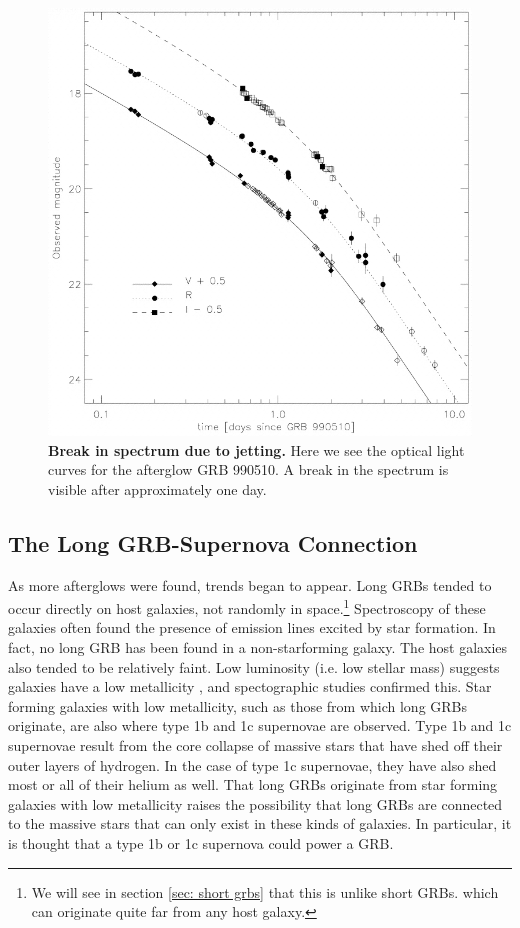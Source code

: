 \documentclass[11pt]{cuthesis}
\begin{document}
\begin{figure} %
\begin{center}
\includegraphics[width=0.8\linewidth]{jetbreak.png}
\end{center}
\caption{\textbf{Break in spectrum due to jetting.} Here we see the optical light curves for the afterglow GRB 990510. A break in the spectrum is visible after approximately one day.\cite{Harrison_1999} }
\label{fig:jetbreak}
\end{figure}

\subsection{The Long GRB-Supernova Connection}
As more afterglows were found, trends began to appear. Long GRBs tended to occur directly on host galaxies, not randomly in space.\footnote{We will see in section \ref{sec: short grbs} that this is unlike short GRBs. which can originate quite far from any host galaxy.} Spectroscopy of these galaxies often found the presence of emission lines excited by star formation. In fact, no long GRB has been found in a non-starforming galaxy. The host galaxies also tended to be relatively faint. Low luminosity (i.e. low stellar mass) suggests galaxies have a low metallicity \cite{Lamareille:2004ja}, and spectographic studies confirmed this. Star forming galaxies with low metallicity, such as those from which long GRBs originate, are also where type 1b and 1c supernovae are observed. Type 1b and 1c supernovae result from the core collapse of massive stars that have shed off their outer layers of hydrogen. \cite{sn_review} In the case of type 1c supernovae, they have also shed most or all of their helium as well. That long GRBs originate from star forming galaxies with low metallicity raises the possibility that long GRBs are connected to the massive stars that can only exist in these kinds of galaxies. In particular, it is thought that a type 1b or 1c supernova could power a GRB.
\end{document}
